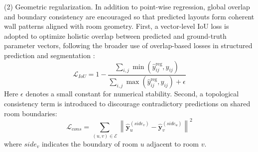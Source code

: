 (2) Geometric regularization. In addition to point-wise regression, global overlap and boundary consistency are encouraged so that predicted layouts form coherent wall patterns aligned with room geometry.
First, a vector-level IoU loss is adopted to optimize holistic overlap between predicted and ground-truth parameter vectors, following the broader use of overlap-based losses in structured prediction and segmentation \cite{huangBatchingSoftIoU2020,zhaoRethinkingDiceLoss2020}:
\begin{equation}
\mathcal{L}_{IoU} = 1 - \frac{\sum_{i,j}\min(\hat{y}_{ij}^{\text{reg}}, y_{ij})}{\sum_{i,j}\max(\hat{y}_{ij}^{\text{reg}}, y_{ij}) + \epsilon}
\label{eq:loss_iou}
\end{equation}
Here $\epsilon$ denotes a small constant for numerical stability.
Second, a topological consistency term is introduced to discourage contradictory predictions on shared room boundaries:
\begin{equation}
\mathcal{L}_{cons} = \sum_{(u,v) \in \mathcal{E}} \left\|\hat{\mathbf{y}}_u^{(side_v)} - \hat{\mathbf{y}}_v^{(side_u)}\right\|^2
\label{eq:loss_cons}
\end{equation}
where $side_v$ indicates the boundary of room $u$ adjacent to room $v$.

